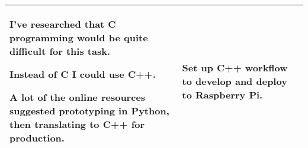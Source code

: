 \begin{table}[!h]
\begin{tabularx}{\textwidth}{|X|X|X|}
        \begin{myitemize}
            \item I've researched that C programming would be quite difficult for this task.
            \item Instead of C I could use C++.
            \item A lot of the online resources suggested prototyping in Python, then translating to C++ for production.
        \end{myitemize} & 
        \begin{myitemize}
            \item Set up C++ workflow to develop and deploy to Raspberry Pi.
        \end{myitemize} \\
        \hline
    \end{tabularx}
\end{table}
